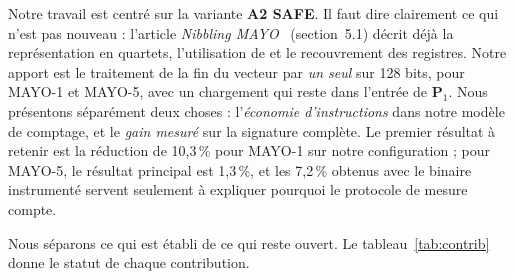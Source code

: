 Notre travail est centré sur la variante \textbf{A2 SAFE}. Il faut dire clairement ce qui n'est pas nouveau : l'article \emph{Nibbling MAYO}~\cite{nibbling} (section~5.1) décrit déjà la représentation en quartets, l'utilisation de  et le recouvrement des registres. Notre apport est le traitement de la fin du vecteur par \emph{un seul}  sur 128 bits, pour MAYO-1 et MAYO-5, avec un chargement qui reste dans l'entrée de $\mathbf{P}_1$. Nous présentons séparément deux choses : l'\emph{économie d'instructions} dans notre modèle de comptage, et le \emph{gain mesuré} sur la signature complète. Le premier résultat à retenir est la réduction de 10,3\,\% pour MAYO-1 sur notre configuration ; pour MAYO-5, le résultat principal est 1,3\,\%, et les 7,2\,\% obtenus avec le binaire instrumenté servent seulement à expliquer pourquoi le protocole de mesure compte.

Nous séparons ce qui est établi de ce qui reste ouvert. Le tableau~\ref{tab:contrib} donne le statut de chaque contribution.

